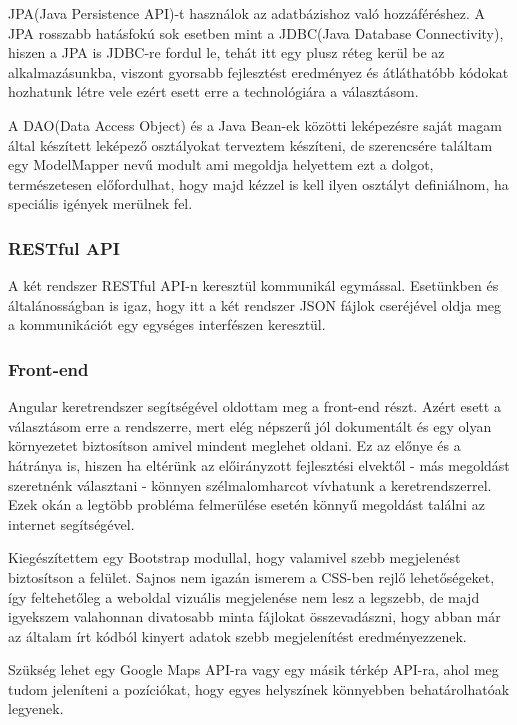 JPA(Java Persistence API)-t használok az adatbázishoz való hozzáféréshez. A JPA rosszabb hatásfokú sok esetben mint a JDBC(Java Database Connectivity), hiszen a JPA is JDBC-re fordul le, tehát itt egy plusz réteg kerül be az alkalmazásunkba, viszont gyorsabb fejlesztést eredményez és átláthatóbb kódokat hozhatunk létre vele ezért esett erre a technológiára a választásom.

A DAO(Data Access Object) és a Java Bean-ek közötti leképezésre saját magam által készített leképező osztályokat terveztem készíteni, de szerencsére találtam egy ModelMapper nevű modult ami megoldja helyettem ezt a dolgot, természetesen előfordulhat, hogy majd kézzel is kell ilyen osztályt definiálnom, ha speciális igények merülnek fel.


\subsubsection{RESTful API}

A két rendszer RESTful API-n keresztül kommunikál egymással. Esetünkben és általánosságban is igaz, hogy itt a két rendszer JSON fájlok cseréjével oldja meg a kommunikációt egy egységes interfészen keresztül.

\subsubsection{Front-end}

Angular keretrendszer segítségével oldottam meg a front-end részt. Azért esett a választásom erre a rendszerre, mert elég népszerű jól dokumentált és egy olyan környezetet biztosítson amivel mindent meglehet oldani. Ez az előnye és a hátránya is, hiszen ha eltérünk az előirányzott fejlesztési elvektől - más megoldást szeretnénk választani - könnyen szélmalomharcot vívhatunk a keretrendszerrel. Ezek okán a legtöbb probléma felmerülése esetén könnyű megoldást találni az internet segítségével.

Kiegészítettem egy Bootstrap modullal, hogy valamivel szebb megjelenést biztosítson a felület. Sajnos nem igazán ismerem a CSS-ben rejlő lehetőségeket, így feltehetőleg a weboldal vizuális megjelenése nem lesz a legszebb, de majd igyekszem valahonnan divatosabb minta fájlokat összevadászni, hogy abban már az általam írt kódból kinyert adatok szebb megjelenítést eredményezzenek.

Szükség lehet egy Google Maps API-ra vagy egy másik térkép API-ra, ahol meg tudom jeleníteni a pozíciókat, hogy egyes helyszínek könnyebben behatárolhatóak legyenek.

